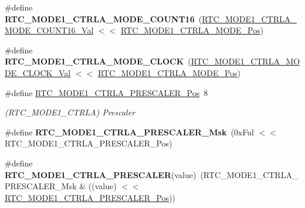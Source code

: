 \begin{DoxyCompactItemize}
\item 
\hypertarget{group___s_a_m_l21___r_t_c_ga2cfc632cd97589bf06d1810152befb01}{}\#define {\bfseries R\+T\+C\+\_\+\+M\+O\+D\+E1\+\_\+\+C\+T\+R\+L\+A\+\_\+\+M\+O\+D\+E\+\_\+\+C\+O\+U\+N\+T16}~(\hyperlink{group___s_a_m_l21___r_t_c_ga5c7f33b205fba3ee8138bed3e6afae01}{R\+T\+C\+\_\+\+M\+O\+D\+E1\+\_\+\+C\+T\+R\+L\+A\+\_\+\+M\+O\+D\+E\+\_\+\+C\+O\+U\+N\+T16\+\_\+\+Val} $<$$<$ \hyperlink{group___s_a_m_l21___r_t_c_ga486afe45119b2d94182c02820cb6f4a7}{R\+T\+C\+\_\+\+M\+O\+D\+E1\+\_\+\+C\+T\+R\+L\+A\+\_\+\+M\+O\+D\+E\+\_\+\+Pos})\label{group___s_a_m_l21___r_t_c_ga2cfc632cd97589bf06d1810152befb01}

\item 
\hypertarget{group___s_a_m_l21___r_t_c_ga62066954d5399bbcca4b4a93fd8d06bc}{}\#define {\bfseries R\+T\+C\+\_\+\+M\+O\+D\+E1\+\_\+\+C\+T\+R\+L\+A\+\_\+\+M\+O\+D\+E\+\_\+\+C\+L\+O\+C\+K}~(\hyperlink{group___s_a_m_l21___r_t_c_ga3750f632507a11fd51820c5eadf2aa2d}{R\+T\+C\+\_\+\+M\+O\+D\+E1\+\_\+\+C\+T\+R\+L\+A\+\_\+\+M\+O\+D\+E\+\_\+\+C\+L\+O\+C\+K\+\_\+\+Val} $<$$<$ \hyperlink{group___s_a_m_l21___r_t_c_ga486afe45119b2d94182c02820cb6f4a7}{R\+T\+C\+\_\+\+M\+O\+D\+E1\+\_\+\+C\+T\+R\+L\+A\+\_\+\+M\+O\+D\+E\+\_\+\+Pos})\label{group___s_a_m_l21___r_t_c_ga62066954d5399bbcca4b4a93fd8d06bc}

\item 
\hypertarget{group___s_a_m_l21___r_t_c_ga90e26e080dcf46aa7e9f09a8ed02ea7e}{}\#define \hyperlink{group___s_a_m_l21___r_t_c_ga90e26e080dcf46aa7e9f09a8ed02ea7e}{R\+T\+C\+\_\+\+M\+O\+D\+E1\+\_\+\+C\+T\+R\+L\+A\+\_\+\+P\+R\+E\+S\+C\+A\+L\+E\+R\+\_\+\+Pos}~8\label{group___s_a_m_l21___r_t_c_ga90e26e080dcf46aa7e9f09a8ed02ea7e}

\begin{DoxyCompactList}\small\item\em (R\+T\+C\+\_\+\+M\+O\+D\+E1\+\_\+\+C\+T\+R\+L\+A) Prescaler \end{DoxyCompactList}\item 
\hypertarget{group___s_a_m_l21___r_t_c_ga5a1744d897cb2b38b527b70b1e27da11}{}\#define {\bfseries R\+T\+C\+\_\+\+M\+O\+D\+E1\+\_\+\+C\+T\+R\+L\+A\+\_\+\+P\+R\+E\+S\+C\+A\+L\+E\+R\+\_\+\+Msk}~(0x\+Ful $<$$<$ R\+T\+C\+\_\+\+M\+O\+D\+E1\+\_\+\+C\+T\+R\+L\+A\+\_\+\+P\+R\+E\+S\+C\+A\+L\+E\+R\+\_\+\+Pos)\label{group___s_a_m_l21___r_t_c_ga5a1744d897cb2b38b527b70b1e27da11}

\item 
\hypertarget{group___s_a_m_l21___r_t_c_ga5c65fc8c829d7fd1df401bcc644e4c5a}{}\#define {\bfseries R\+T\+C\+\_\+\+M\+O\+D\+E1\+\_\+\+C\+T\+R\+L\+A\+\_\+\+P\+R\+E\+S\+C\+A\+L\+E\+R}(value)~(R\+T\+C\+\_\+\+M\+O\+D\+E1\+\_\+\+C\+T\+R\+L\+A\+\_\+\+P\+R\+E\+S\+C\+A\+L\+E\+R\+\_\+\+Msk \& ((value) $<$$<$ \hyperlink{group___s_a_m_l21___r_t_c_ga90e26e080dcf46aa7e9f09a8ed02ea7e}{R\+T\+C\+\_\+\+M\+O\+D\+E1\+\_\+\+C\+T\+R\+L\+A\+\_\+\+P\+R\+E\+S\+C\+A\+L\+E\+R\+\_\+\+Pos}))\label{group___s_a_m_l21___r_t_c_ga5c65fc8c829d7fd1df401bcc644e4c5a}


\end{DoxyCompactItemize}
